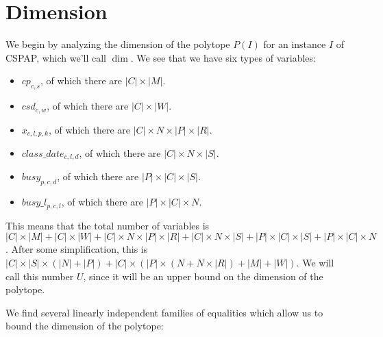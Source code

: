 \section{Dimension}

We begin by analyzing the dimension of the polytope $P(I)$ for an instance $I$ of CSPAP, which we'll call $\dim$. We see that we have six types of variables:
\begin{itemize}
\item $cp_{c, s}$, of which there are $|C| \times |M|$.
\item $csd_{c, w}$, of which there are $|C| \times |W|$.
\item $x_{c, l, p, k}$, of which there are $|C| \times N \times |P| \times |R|$.
\item $class\_date_{c, l, d}$, of which there are $|C| \times N \times |S|$.
\item $busy_{p, c, d}$, of which there are $|P| \times |C| \times |S|$.
\item $busy\_l_{p, c, l}$, of which there are $|P| \times |C| \times N$.
\end{itemize}

This means that the total number of variables is $|C| \times |M| + |C| \times |W| + |C| \times N \times |P| \times |R| + |C| \times N \times |S| + |P| \times |C| \times |S| + |P| \times |C| \times N$. After some simplification, this is $|C| \times |S| \times (|N| + |P|) + |C| \times (|P| \times (N + N \times |R|) +|M| + |W|)$. We will call this number $U$, since it will be an upper bound on the dimension of the polytope.


We find several linearly independent families of equalities which allow us to bound the dimension of the polytope:

